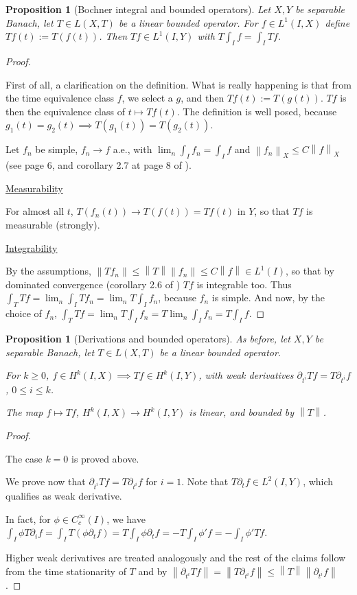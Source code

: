 \documentclass[english,a4paper,12pt,oneside]{scrbook}
\theoremstyle{break}
\newtheorem{prop}[equation]{Proposition}
\newenvironment{mproof}[1][\proofname]{%
  \begin{proof}[#1]$ $\par\nobreak\ignorespaces
}{%
  \end{proof}
}
\renewcommand*{\proofname}{Proof}
\theoremstyle{remark}
\newcommand{\norm}[1]{\left\lVert#1\right\rVert}
\begin{document}
\begin{prop}[Bochner integral and bounded operators]
\label{prop:bochner_bound}
Let $X,Y$ be separable Banach, let $T \in L(X,T)$ be a linear bounded operator. For $f \in L^1(I,X)$ define $Tf (t):= T(f(t))$. Then $Tf \in L^1(I,Y)$ with $T\int_I f = \int_I Tf$.
\end{prop}
\begin{mproof}

First of all, a clarification on the definition. What is really happening is that from the time equivalence class $f$, we select a $g$, and then $Tf(t):=T(g(t))$. $Tf$ is then the equivalence class of $t\mapsto Tf(t)$. The definition is well posed, because $g_1(t)=g_2(t)\implies T(g_1(t))=T(g_2(t))$.

Let $f_n$ be simple, $f_n\rightarrow f $ a.e., with $\lim_n \int_I f_n = \int_I f$ and $\norm{f_n}_X \leq C \norm{f}_X$ (see page 6, and corollary 2.7 at page 8 of \cite{kreuter}).

\underline{Measurability}

For almost all $t$, $T(f_n(t)) \rightarrow T(f(t))=Tf(t)$ in $Y$, so that $Tf$ is measurable (strongly).

\underline{Integrability}

By the assumptions, $\norm{Tf_n}\leq \norm{T}\norm{f_n}\leq C\norm{f}\in L^1(I)$, so that by dominated convergence (corollary 2.6 of \cite{kreuter}) $Tf$ is integrable too. Thus $\int_T Tf = \lim_n \int_I  Tf_n = \lim_n T\int_I  f_n$, because $f_n$ is simple. And now, by the choice of $f_n$, $\int_T Tf = \lim_n T\int_I  f_n = T \lim_n \int_I  f_n = T \int_I f$.

\end{mproof}

\begin{prop}	[Derivations and bounded operators]
\label{lemma:bochner_Hk_map}
As before, let $X,Y$ be separable Banach, let $T \in L(X,T)$ be a linear bounded operator.

For $k\geq 0$, $f \in H^k(I,X)\implies Tf \in H^k(I,Y)$, with weak derivatives $\partial_{t^i}Tf = T\partial_{t^i}f$, $0\leq i \leq k$.

The map $f \mapsto Tf$, $H^k(I,X)\rightarrow H^k(I,Y)$ is linear, and bounded by $\norm{T}$.
\end{prop}
\begin{mproof}
The case $k=0$ is proved above.

We prove now that $\partial_{t^i}Tf = T\partial_{t^i}f$ for $i=1$. Note that $T\partial_t f \in L^2(I,Y)$, which qualifies as weak derivative.

In fact, for $\phi \in C_c^\infty(I)$, we have $\int_I \phi T\partial_i f = \int_I T(\phi\partial_t f) = T \int_I\phi\partial_t f = -T\int_I\phi'f=-\int_I\phi'Tf$.

Higher weak derivatives are treated analogously and the rest of the claims follow from the time stationarity of $T$ and by $\norm{\partial_{t^i}Tf}=\norm{T\partial_{t^i}f}\leq \norm{T}\norm{\partial_{t^i}f}$.

\end{mproof}
\end{document}
